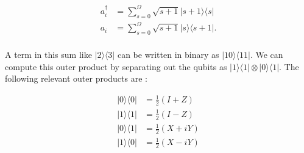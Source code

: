\begin{align}
    a_i^\dagger &= \sum_{s = 0}^{\Omega} \sqrt{s + 1}|s + 1\rangle \langle s|\\ \nonumber
    a_i &= \sum_{s = 0}^{\Omega} \sqrt{s + 1}|s\rangle \langle s + 1|.\\
\end{align}

A term in this sum like $|2\rangle \langle 3|$ can be written in binary as $|10\rangle \langle 11|$. 
We can compute this outer product by separating out the qubits as $|1\rangle \langle 1| \otimes |0\rangle \langle 1|$.
The following relevant outer products are :

\begin{align*}
    |0\rangle \langle 0| &= \frac12 (I + Z)\\
    |1\rangle \langle 1| &= \frac12 (I - Z)\\
    |0\rangle \langle 1| &= \frac12 (X + iY)\\
    |1\rangle \langle 0| &= \frac12 (X - iY)\\
\end{align*}
